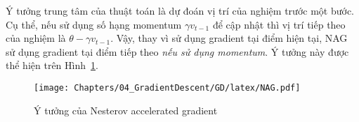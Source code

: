  
Ý tưởng trung tâm của thuật toán là {dự đoán vị trí của nghiệm trước một bước}.
Cụ thể, nếu sử dụng số hạng {momentum} $\gamma v_{t-1}$ để cập nhật thì vị trí
tiếp theo của nghiệm là $\theta - \gamma v_{t-1}$. Vậy, thay vì sử dụng gradient
tại điểm hiện tại, NAG sử dụng gradient tại điểm tiếp theo \textit{nếu sử dụng
momentum}. Ý tưởng này được thể hiện trên Hình~\ref{fig:8_mynag}.
 
\begin{figure}[t]
\centering
    \texttt{[image: Chapters/04\_GradientDescent/GD/latex/NAG.pdf]}
    \caption[]{Ý tưởng của Nesterov accelerated gradient}
    \label{fig:8_mynag}
\end{figure}

 

 
